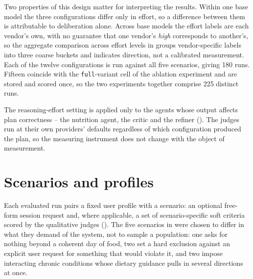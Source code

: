 Two properties of this design matter for interpreting the results. Within one base model the three configurations differ only in effort, so a difference between them is attributable to deliberation alone. Across base models the effort labels are each vendor's own, with no guarantee that one vendor's \emph{high} corresponds to another's, so the aggregate comparison across effort levels in  groups vendor-specific labels into three coarse buckets and indicates direction, not a calibrated measurement. Each of the twelve configurations is run against all five scenarios, giving \num{180} runs. Fifteen coincide with the \texttt{full}-variant cell of the ablation experiment and are stored and scored once, so the two experiments together comprise \num{225} distinct runs.

The reasoning-effort setting is applied only to the agents whose output affects plan correctness -- the nutrition agent, the critic and the refiner (). The judges run at their own providers' defaults regardless of which configuration produced the plan, so the measuring instrument does not change with the object of measurement.

\section{Scenarios and profiles}
\label{sec:methodology-scenarios}

Each evaluated run pairs a fixed user profile with a scenario: an optional free-form session request and, where applicable, a set of scenario-specific soft criteria scored by the qualitative judges (). The five scenarios in  were chosen to differ in what they demand of the system, not to sample a population: one asks for nothing beyond a coherent day of food, two set a hard exclusion against an explicit user request for something that would violate it, and two impose interacting chronic conditions whose dietary guidance pulls in several directions at once.


